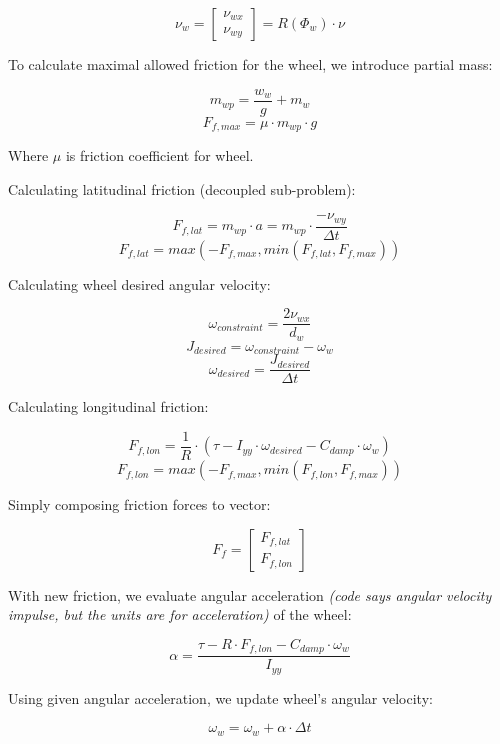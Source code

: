 \documentclass[a4paper,11pt]{article}
\begin{document}
\begin{center}
\[
\nu_w =
\begin{bmatrix}
\nu_{wx} \\
\nu_{wy}
\end{bmatrix}
=R(\Phi_w) \cdot \nu
\]
\end{center}

To calculate maximal allowed friction for the wheel, we introduce partial mass:
\begin{center}
\[
m_{wp} = \frac{w_w}{g} + m_w
\]
\[
F_{f, max} = \mu \cdot m_{wp} \cdot g
\]
\end{center}
Where $\mu$ is friction coefficient for wheel.

Calculating latitudinal friction (decoupled sub-problem):
\begin{center}
\[
F_{f,lat} = m_{wp} \cdot a = m_{wp} \cdot \frac{-\nu_{wy}}{\Delta t}
\]
\[
F_{f,lat} = max(-F_{f,max}, min(F_{f,lat}, F_{f,max}))
\]
\end{center}

Calculating wheel desired angular velocity:

\begin{center}
\[
\omega_{constraint} = \frac{2\nu_{wx}}{d_w}
\]
\[
J_{desired} = \omega_{constraint} - \omega_w
\]
\[
\omega_{desired} = \frac{J_{desired}}{\Delta t}
\]
\end{center}


Calculating longitudinal friction:
\begin{center}
\[
F_{f,lon} = \frac{1}{R} \cdot (\tau - I_{yy}\cdot \omega_{desired} - C_{damp} \cdot \omega_w)
\]
\[
F_{f,lon} = max(-F_{f,max}, min(F_{f,lon}, F_{f,max}))
\]
\end{center}

Simply composing friction forces to vector:
\begin{center}
\[
F_f =
\begin{bmatrix}
F_{f,lat} \\
F_{f,lon}
\end{bmatrix}
\]
\end{center}

With new friction, we evaluate angular acceleration \textit{(code says angular velocity impulse, but the units are for acceleration)}  of the wheel:
\begin{center}
\[
\alpha = \frac{ \tau - R \cdot F_{f,lon} - C_{damp} \cdot \omega_w}{I_{yy}}
\]
\end{center}

Using given angular acceleration, we update wheel's angular velocity:
\begin{center}
$$
\omega_w = \omega_w + \alpha \cdot \Delta t
$$
\end{center}
\end{document}
